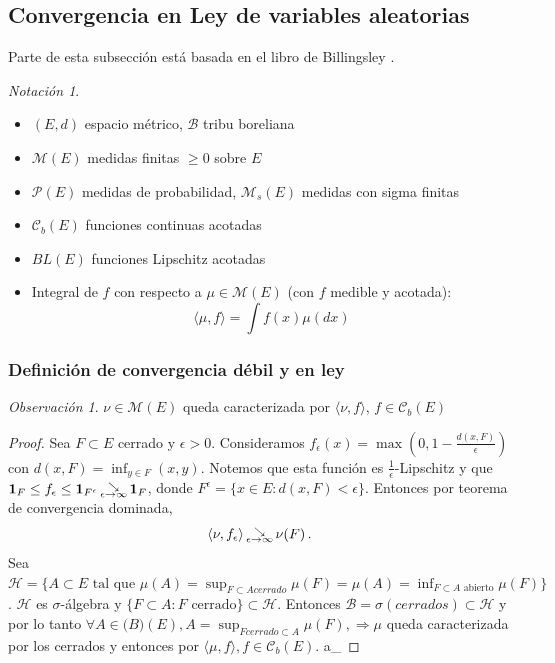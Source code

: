 \documentclass[letterpaper,11pt]{article} %
\theoremstyle{defbreak}
\theoremstyle{propbreak}
\theoremstyle{remark}
\newtheorem{remark}{Observación}[subsection]
\newtheorem*{notation}{Notación}
\theoremstyle{break}
\def\searroweps{\,\substack{\searrow \\ \tiny{\epsilon\to\infty}}\,}
\def\beforeitemize{\leavevmode \vspace{-0.5\baselineskip}}
\def\gris{\color{mygray}}
\def\negro{\color{black}}
\def\findem{\null\hfill\color{white}a\color{black}_\square}
\begin{document}
\subsection{Convergencia en Ley de variables aleatorias}
Parte de esta subsección está basada en el libro de Billingsley \cite{billing}.
\begin{notation}
\beforeitemize
\begin{itemize}
    \item $(E,d)$ espacio métrico, $\mathcal{B}$ tribu boreliana
    \item $\mathcal{M}(E)$ medidas finitas $\geq0$ sobre $E$
    \item $\mathcal{P}(E)$ medidas de probabilidad, $\mathcal{M}_s(E)$ medidas con sigma finitas %
    \item $\mathcal{C}_b(E)$ funciones continuas acotadas %
    \item $BL(E)$ funciones Lipschitz acotadas
    \item Integral de $f$ con respecto a $\mu \in \mathcal{M}(E)$ (con $f$ medible y acotada): $$ \langle \mu, f \rangle = \int f(x)\mu(dx) $$
\end{itemize}
\end{notation}

\subsubsection{Definición de convergencia débil y en ley}
\begin{remark}
$\nu \in \mathcal{M}(E)$ queda caracterizada por $\langle \nu,f \rangle$, $f \in \mathcal{C}_b(E)$
\end{remark}
\begin{proof}\gris Sea $F\subset E$ cerrado y $\epsilon>0$. Consideramos $f_\epsilon(x) = \max (0,1-\frac{d(x,F)}{\epsilon})$ con $d(x,F)=\displaystyle\inf_{y\in F}(x,y)$. Notemos que esta función es $\frac{1}{\epsilon}$-Lipschitz y que $\mathbf{1}_F\leq f_\epsilon\leq\mathbf{1}_{F^\epsilon}\searroweps\mathbf{1}_F$, donde $F^\epsilon = \{x \in E : d(x,F)<\epsilon\}$. Entonces por teorema de convergencia dominada, 
$$ \langle \nu,f_\epsilon \rangle \searroweps \nu(F) \, . $$
Sea $\displaystyle\mathcal{H}=\{A\subset E \mbox{ tal que }\mu(A)=\sup_{F\subset A cerrado}\mu(F)=\mu(A)=\inf_{F\subset A\mbox{ abierto}}\mu(F)\}$. $\mathcal{H}$ es $\sigma$-álgebra y $\{F\subset A : F\mbox{ cerrado}\}\subset\mathcal{H}$. Entonces $\mathcal{B}=\sigma(cerrados)\subset\mathcal{H}$ y por lo tanto $\displaystyle\forall A\in\mathcal(B)(E),A=\sup_{F cerrado \subset A}\mu(F),\Rightarrow \mu$ queda caracterizada por los cerrados y entonces por $\langle \mu,f \rangle, f\in\mathcal{C}_b(E)$. 
\negro \findem
\end{proof}
\end{document}
